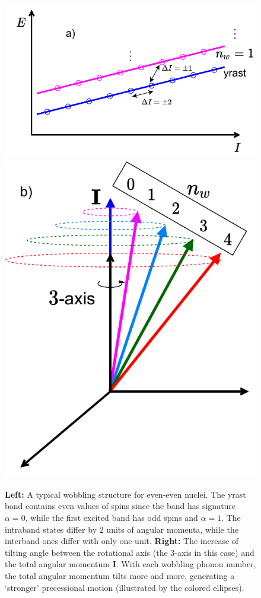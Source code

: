 \begin{figure}
    \centering
    \includegraphics[scale=0.72]{Chapters/Figures/wobbling_n_schematic-1.pdf}
    \includegraphics[scale=0.6]{Chapters/Figures/wobbling_n_schematic-2.pdf}
    \caption{\textbf{Left:} A typical wobbling structure for even-even nuclei. The yrast band contains even values of spins since the band has signature $\alpha=0$, while the first excited band has odd spins and $\alpha=1$. The intraband states differ by 2 units of angular momenta, while the interband ones differ with only one unit. \textbf{Right:} The increase of tilting angle between the rotational axis (the $3$-axis in this case) and the total angular momentum $\mathbf{I}$. With each wobbling phonon number, the total angular momentum tilts more and more, generating a `stronger' precessional motion (illustrated by the colored ellipses).}
    \label{wobbling-geometry-tilting-sketch}    
\end{figure}


